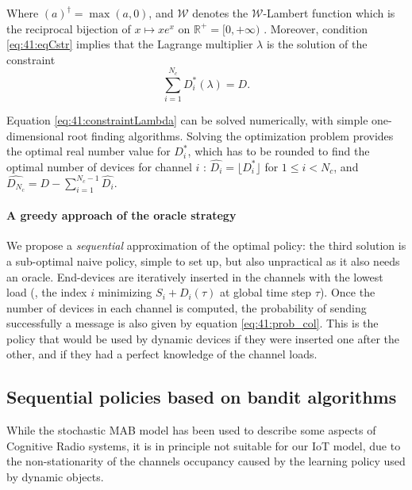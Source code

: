 Where $(a)^{\dag} = \max(a,0)$, and $\mathcal{W}$ denotes the $\mathcal{W}$-Lambert function which is the reciprocal bijection of $x \mapsto xe^x$ on $\mathbb{R^+} = [0, +\infty)$ \cite{Corless96}.
Moreover, condition \eqref{eq:41:eqCstr} implies that the Lagrange multiplier $\lambda$ is the solution of the constraint
\begin{equation}\label{eq:41:constraintLambda}
 \sum_{i=1}^{N_c} D_i^*(\lambda) = D.
\end{equation}


Equation \eqref{eq:41:constraintLambda} can be solved numerically, with simple one-dimensional root finding algorithms.
Solving the optimization problem provides the optimal real number value for $D_i^*$, which has to be rounded to find the optimal number of devices for channel $i$ :
$\widehat{D_i} = \lfloor D_i^* \rfloor$ for $1 \leq i < N_c$, and $\widehat{D_{N_c}} = D - \sum_{i=1}^{N_c - 1} \widehat{D_i}$.

\paragraph{A greedy approach of the oracle strategy}

We propose a \emph{sequential} approximation of the optimal policy:
the third solution is a sub-optimal naive policy, simple to set up, but also unpractical as it also needs an oracle.
End-devices are iteratively inserted in the channels with the lowest load (\ie, the index $i$ minimizing $S_i + D_i(\tau)$ at global time step $\tau$). Once the number of devices in each channel is computed, the probability of sending successfully a message is also given by equation \eqref{eq:41:prob_col}.
This is the policy that would be used by dynamic devices if they were inserted one after the other, and if they had a perfect knowledge of the channel loads.

\subsection{Sequential policies based on bandit algorithms}\label{sub:41:sequentialPolicies}

While the stochastic MAB model has been used to describe some aspects of Cognitive Radio systems, it is in principle not suitable for our IoT model, due to the non-stationarity of the channels occupancy caused by the learning policy used by dynamic objects.


